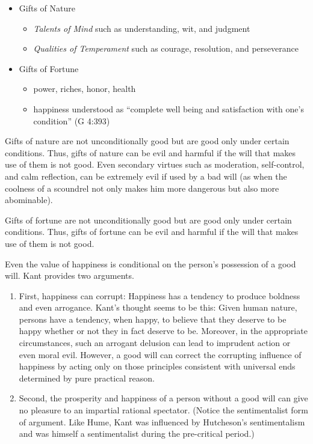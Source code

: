 \begin{itemize}
	\item Gifts of Nature
        \begin{itemize}
        	\item \emph{Talents of Mind} such as understanding, wit, and judgment
            \item \emph{Qualities of Temperament} such as courage, resolution, and perseverance
        \end{itemize}
    \item Gifts of Fortune
    \begin{itemize}
	    \item power, riches, honor, health
        \item happiness understood as ``complete well being and satisfaction with one’s condition'' (G 4:393)
    \end{itemize}
\end{itemize}

Gifts of nature are not unconditionally good but are good only under certain conditions. Thus, gifts of nature can be evil and harmful if the will that makes use of them is not good. Even secondary virtues such as moderation, self-control, and calm reflection, can be extremely evil if used by a bad will (as when the coolness of a scoundrel not only makes him more dangerous but also more abominable).

Gifts of fortune are not unconditionally good but are good only under certain conditions. Thus, gifts of fortune can be evil and harmful if the will that makes use of them is not good.

Even the value of happiness is conditional on the person’s possession of a good will. Kant provides two arguments.

\begin{enumerate}
	\item First, happiness can corrupt: Happiness has a tendency to produce boldness and even arrogance. Kant’s thought seems to be this: Given human nature, persons have a tendency, when happy, to believe that they deserve to be happy whether or not they in fact deserve to be. Moreover, in the appropriate circumstances, such an arrogant delusion can lead to imprudent action or even moral evil. However, a good will can correct the corrupting influence of happiness by acting only on those principles consistent with universal ends determined by pure practical reason.
	\item Second, the prosperity and happiness of a person without a good will can give no pleasure to an impartial rational spectator. (Notice the sentimentalist form of argument. Like Hume, Kant was influenced by Hutcheson’s sentimentalism and was himself a sentimentalist during the pre-critical period.)
\end{enumerate}

